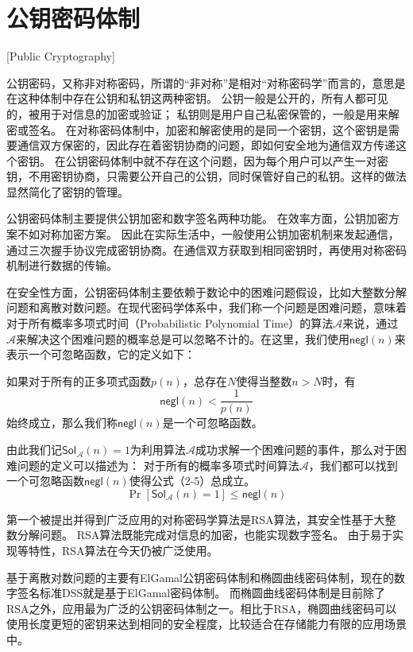 \section{公钥密码体制}[Public Cryptography]

公钥密码，又称非对称密码，所谓的“非对称”是相对“对称密码学”而言的，意思是在这种体制中存在公钥和私钥这两种密钥。
公钥一般是公开的，所有人都可见的，被用于对信息的加密或验证；
私钥则是用户自己私密保管的，一般是用来解密或签名。
在对称密码体制中，加密和解密使用的是同一个密钥，这个密钥是需要通信双方保密的，因此存在着密钥协商的问题，即如何安全地为通信双方传递这个密钥。
在公钥密码体制中就不存在这个问题，因为每个用户可以产生一对密钥，不用密钥协商，只需要公开自己的公钥，同时保管好自己的私钥。这样的做法显然简化了密钥的管理。

公钥密码体制主要提供公钥加密和数字签名两种功能。
在效率方面，公钥加密方案不如对称加密方案。
因此在实际生活中，一般使用公钥加密机制来发起通信，通过三次握手协议完成密钥协商。在通信双方获取到相同密钥时，再使用对称密码机制进行数据的传输。

在安全性方面，公钥密码体制主要依赖于数论中的困难问题假设，比如大整数分解问题和离散对数问题。在现代密码学体系中，我们称一个问题是困难问题，意味着对于所有概率多项式时间（Probabilistic Polynomial Time）的算法$\mathcal{A}$来说，通过$\mathcal{A}$来解决这个困难问题的概率总是可以忽略不计的。在这里，我们使用$\mathsf{negl}(n)$来表示一个可忽略函数，它的定义如下：

如果对于所有的正多项式函数$p(n)$，总存在$N$使得当整数$n>N$时，有
\begin{equation}
\mathsf{negl}(n)<\frac{1}{p(n)}
\end{equation}
始终成立，那么我们称$\mathsf{negl}(n)$是一个可忽略函数。

由此我们记$\mathsf{Sol}_{\mathcal{A}}(n)=1$为利用算法$\mathcal{A}$成功求解一个困难问题的事件，那么对于困难问题的定义可以描述为：
对于所有的概率多项式时间算法$\mathcal{A}$，我们都可以找到一个可忽略函数$\mathsf{negl}(n)$使得公式（2-5）总成立。
\begin{equation}
\Pr[\mathsf{Sol}_\mathcal{A}(n)=1]\leq\mathsf{negl}(n)
\end{equation}

第一个被提出并得到广泛应用的对称密码学算法是RSA算法，其安全性基于大整数分解问题。
RSA算法既能完成对信息的加密，也能实现数字签名\cite{rivest1978method}。
由于易于实现等特性，RSA算法在今天仍被广泛使用。

基于离散对数问题的主要有ElGamal公钥密码体制和椭圆曲线密码体制，现在的数字签名标准DSS就是基于ElGamal密码体制。
而椭圆曲线密码体制是目前除了RSA之外，应用最为广泛的公钥密码体制之一。相比于RSA，椭圆曲线密码可以使用长度更短的密钥来达到相同的安全程度，比较适合在存储能力有限的应用场景中。

